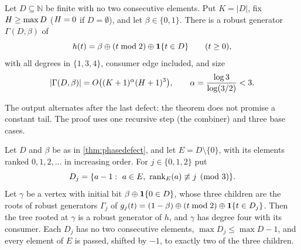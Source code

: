 \begin{theorem}\label{thm:phasedefect}
Let $D\subseteq\mathbb N$ be finite with no two consecutive elements. Put $K=|D|$, fix $H\ge\max D$
($H=0$ if $D=\emptyset$), and let $\beta\in\{0,1\}$. There is a robust generator $\Gamma(D,\beta)$
of
\[
h(t)=\beta\oplus(t\bmod 2)\oplus\mathbf{1}\{t\in D\}\qquad(t\ge 0),
\]
with all degrees in $\{1,3,4\}$, consumer edge included, and size
\begin{equation}\label{eq:gensize}
|\Gamma(D,\beta)|=O\bigl((K+1)^{\alpha}(H+1)^3\bigr),\qquad \alpha=\frac{\log 3}{\log(3/2)}<3 .
\end{equation}
\end{theorem}

The output alternates after the last defect: the theorem does not promise a constant tail. The
proof uses one recursive step (the combiner) and three base cases.

\begin{lemma}[Combiner]\label{lem:combiner}
Let $D$ and $\beta$ be as in \cref{thm:phasedefect}, and let $E=D\setminus\{0\}$, with its elements
ranked $0,1,2,\dots$ in increasing order. For $j\in\{0,1,2\}$ put
\begin{equation}\label{eq:childsets}
D_j=\{a-1:\ a\in E,\ \operatorname{rank}_E(a)\not\equiv j\pmod 3\}.
\end{equation}
Let $\gamma$ be a vertex with initial bit $\beta\oplus\mathbf{1}\{0\in D\}$, whose three children are the
roots of robust generators $\Gamma_j$ of $g_j(t)=(1-\beta)\oplus(t\bmod 2)\oplus\mathbf{1}\{t\in D_j\}$. Then
the tree rooted at $\gamma$ is a robust generator of $h$, and $\gamma$ has degree four with its
consumer. Each $D_j$ has no two consecutive elements, $\max D_j\le\max D-1$, and every element of
$E$ is passed, shifted by $-1$, to exactly two of the three children.
\end{lemma}

